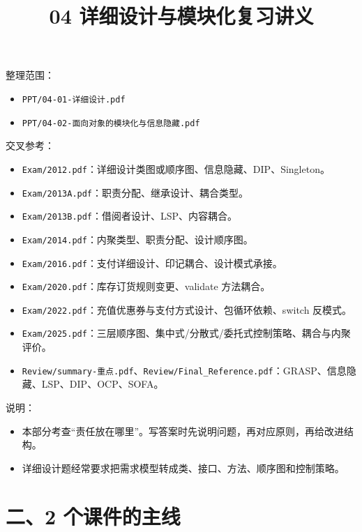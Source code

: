 \documentclass[UTF8,zihao=-4]{ctexart}
\title{04 详细设计与模块化复习讲义}
\author{}
\date{}
\begin{document}
\maketitle
\tableofcontents
\newpage


整理范围：

\begin{itemize}
\item \texttt{PPT/04-01-详细设计.pdf}
\item \texttt{PPT/04-02-面向对象的模块化与信息隐藏.pdf}
\end{itemize}

交叉参考：

\begin{itemize}
\item \texttt{Exam/2012.pdf}：详细设计类图或顺序图、信息隐藏、DIP、Singleton。
\item \texttt{Exam/2013A.pdf}：职责分配、继承设计、耦合类型。
\item \texttt{Exam/2013B.pdf}：借阅者设计、LSP、内容耦合。
\item \texttt{Exam/2014.pdf}：内聚类型、职责分配、设计顺序图。
\item \texttt{Exam/2016.pdf}：支付详细设计、印记耦合、设计模式承接。
\item \texttt{Exam/2020.pdf}：库存订货规则变更、validate 方法耦合。
\item \texttt{Exam/2022.pdf}：充值优惠券与支付方式设计、包循环依赖、switch 反模式。
\item \texttt{Exam/2025.pdf}：三层顺序图、集中式/分散式/委托式控制策略、耦合与内聚评价。
\item \texttt{Review/summary-重点.pdf}、\texttt{Review/Final\_Reference.pdf}：GRASP、信息隐藏、LSP、DIP、OCP、SOFA。
\end{itemize}

说明：

\begin{itemize}
\item 本部分考查“责任放在哪里”。写答案时先说明问题，再对应原则，再给改进结构。
\item 详细设计题经常要求把需求模型转成类、接口、方法、顺序图和控制策略。
\end{itemize}

\section{二、2 个课件的主线}
\end{document}
